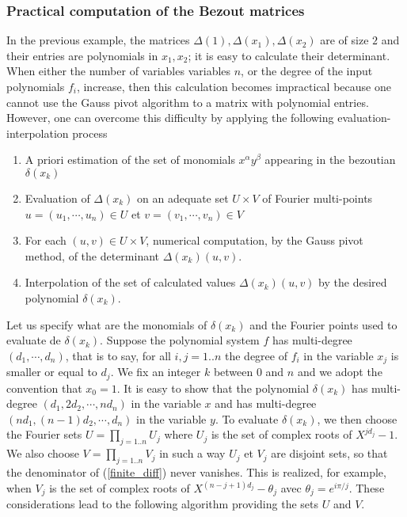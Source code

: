 \documentclass{standalone}
\begin{document}
\subsubsection{Practical computation of the Bezout matrices}
In the previous example, the matrices $\Delta(1), \Delta(x_1), \Delta(x_2)$ are of size $2$ and their entries are polynomials in $x_1, x_2$; it is easy to calculate their determinant. When either the number of variables variables $n$, or the degree of the input polynomials $f_i$, increase, then this calculation becomes impractical because one cannot use the Gauss pivot algorithm to a matrix with polynomial entries. However, one can overcome this difficulty by applying the following evaluation-interpolation process
\begin{enumerate}
\item
A priori estimation of the set of monomials $x^\alpha y^\beta$ appearing in the bezoutian $\delta(x_k)$
\item
Evaluation of $\Delta(x_k)$ on an adequate set $U \times V$ of Fourier multi-points $u = (u_1,\cdots, u_n) \in U$ et $v = (v_1,\cdots, v_n) \in V$
\item
For each $(u, v) \in U\times V$, numerical computation, by the Gauss pivot method, of the determinant $\Delta(x_k)(u, v)$.
\item
Interpolation of the set of calculated values $\Delta(x_k)(u, v)$ by the desired polynomial $\delta(x_k)$.
\end{enumerate}
Let us specify what are the monomials of $\delta(x_k)$ and the Fourier points used to evaluate de $\delta(x_k)$. Suppose the polynomial system $f$ has multi-degree $(d_1, \cdots, d_n)$, that is to say, for all $i, j = 1..n$ the degree of $f_i$ in the variable $x_j$ is smaller or equal to $d_j$. We fix an integer $k$ between $0$ and $n$ and we adopt the convention that $x_0 = 1$. It is easy to show that the polynomial $\delta(x_k)$ has multi-degree $(d_1, 2d_2, \cdots, nd_n)$ in the variable $x$ and has multi-degree $(nd_1, (n-1)d_2, \cdots, d_n)$ in the variable $y$. To evaluate $\delta(x_k)$, we then choose the Fourier sets $U = \prod_{j=1..n} U_j$ where $U_j$ is the set of complex roots of $X^{jd_j} - 1$. We also choose $V = \prod_{j=1..n} V_j$ in such a way $U_j$ et $V_j$ are disjoint sets, so that the denominator of (\ref{finite_diff}) never vanishes. This is realized, for example, when $V_j$ is the set of complex roots of $X^{(n-j+1)d_j} - \theta_j$ avec $\theta_j = e^{i\pi/j}$. 
These considerations lead to the following algorithm providing the sets $U$ and $V$.
\end{document}

